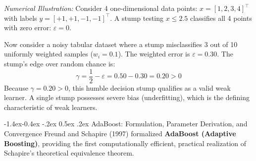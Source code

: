 \documentclass[11pt,a4paper]{article}
\makeatletter
\renewcommand\subsection{\@startsection{subsection}{2}{\z@}%
                                     {-1.4ex\@plus -0.4ex \@minus -.2ex}%
                                     {0.5ex \@plus .2ex}%
                                     {\normalfont\normalsize\bfseries}}
\makeatother
\begin{document}
\emph{Numerical Illustration:} Consider 4 one-dimensional data points: $x = [1, 2, 3, 4]^\top$ with labels $y = [+1, +1, -1, -1]^\top$. A stump testing $x \le 2.5$ classifies all 4 points with zero error: $\varepsilon = 0$. 

Now consider a noisy tabular dataset where a stump misclassifies 3 out of 10 uniformly weighted samples ($w_i = 0.1$). The weighted error is $\varepsilon = 0.30$. The stump's edge over random chance is:
\begin{equation*}
    \gamma = \frac{1}{2} - \varepsilon = 0.50 - 0.30 = 0.20 > 0
\end{equation*}
Because $\gamma = 0.20 > 0$, this humble decision stump qualifies as a valid weak learner. A single stump possesses severe bias (underfitting), which is the defining characteristic of weak learners.

\subsection{AdaBoost: Formulation, Parameter Derivation, and Convergence}
\label{sec:adaboost}
Freund and Schapire (1997) formalized \textbf{AdaBoost (Adaptive Boosting)}, providing the first computationally efficient, practical realization of Schapire's theoretical equivalence theorem.
\end{document}
